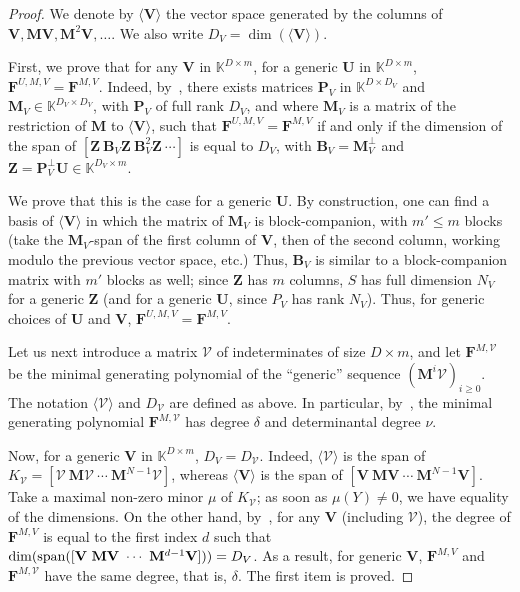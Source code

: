 \documentclass[12pt]{article}
\def\K {\ensuremath{\mathbb{K}}}
\def\scrV {\ensuremath{\mathscr{V}}}
\def\K{\mathbb{K}}
\def\mB{\mathbf{B}}
\def\mF{\mathbf{F}}
\def\mM{\mathbf{M}}
\def\mU{\mathbf{U}}
\def\mV{\mathbf{V}}
\def\mZ{\mathbf{Z}}
\begin{document}
\begin{proof}
	We denote by $\langle \mV \rangle$ the vector
	space generated by the columns of $\mV,\mM\mV,\mM^2\mV,\dots$. We also write
	$D_V=\dim(\langle \mV \rangle)$.
	
	First, we prove that for any $\mV$ in $\K^{D \times m}$, for a generic
	$\mU$ in $\K^{D\times m}$, $\mF^{U,M,V}=\mF^{M,V}$.  Indeed,
	by~\cite[Lemma~4.2]{Villard97a}, there exists matrices $\mathbf{P}_V$ in
	$\K^{D\times D_V}$ and $\mM_V \in \K^{D_V \times D_V}$, with $\mathbf{P}_V$ of
	full rank $D_V$, and where $\mM_V$ is a matrix of the restriction of $\mM$
	to $\langle \mV \rangle$, such that $\mF^{U,M,V}=\mF^{M,V}$ if and only if
	the dimension of the span of $[\mZ ~ \mB_V \mZ ~\mB_V^2 \mZ ~ \cdots]$ is equal to
	$D_V$, with $\mB_V=\mM_V^\perp$ and $\mZ=\mathbf{P}_V^\perp \mU \in \K^{D_V \times m}$.
	
	We prove that this is the case for a generic $\mU$. By construction, one
	can find a basis of $\langle \mV \rangle$ in which the matrix of $\mM_V$
	is block-companion, with $m' \le m$ blocks (take the $\mM_V$-span of the
	first column of $\mV$, then of the second column, working modulo the
	previous vector space, etc.) Thus, $\mB_V$ is similar to a
	block-companion matrix with $m'$ blocks as well; since $\mZ$ has $m$
	columns, $S$ has full dimension $N_V$ for a generic $\mZ$ (and for a
	generic $\mU$, since $P_V$ has rank $N_V$). Thus, for generic choices of
	$\mU$ and $\mV$, $\mF^{U,M,V}=\mF^{M,V}$.
	
	Let us next introduce a matrix $\scrV$ of indeterminates of size $D
	\times m$, and let $\mF^{M,\scrV}$ be the minimal generating polynomial
	of the ``generic'' sequence $(\mM^i \scrV)_{i \ge 0}$. The notation
	$\langle \scrV \rangle$ and $D_\scrV$ are defined as above.  In
	particular, by~\cite[Proposition~6.1]{Villard97a}, the minimal
	generating polynomial $\mF^{M,\scrV}$ has degree $\delta$ and
	determinantal degree $\nu$.
	
	Now, for a generic $\mV$ in $\K^{D\times m}$, $D_V=D_\scrV$. Indeed,
	$\langle \scrV\rangle$ is the span of $K_\scrV=[\scrV ~ \mM \scrV ~ \cdots ~
	\mM^{N-1} \scrV]$, whereas $\langle \mV \rangle$ is the span of $[\mV ~ \mM \mV
	~ \cdots ~\mM^{N-1} \mV]$. Take a maximal non-zero minor $\mu$ of
	$K_\scrV$; as soon as $\mu(Y)\ne 0$, we have equality of the
	dimensions. On the other hand, by~\cite[Lemma~4.3]{Villard97a}, for
	any $\mV$ (including $\scrV$), the degree of $\mF^{M,V}$ is equal to the
	first index $d$ such that $\dim({\rm span}([\mV ~ \mM \mV ~ \cdots ~\mM^{d-1}
	\mV]))=D_V$. As a result, for generic $\mV$, $\mF^{M,V}$ and $\mF^{M,\scrV}$
	have the same degree, that is, $\delta$.  The first item is proved.
	

\end{proof}
\end{document}
